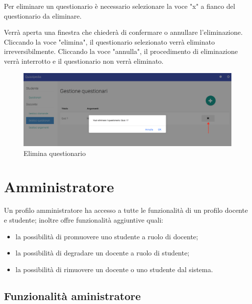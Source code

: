 \documentclass[12pt,a4paper]{article}
\begin{document}
		\par Per eliminare un questionario è necessario selezionare la voce "x" a fianco del questionario da eliminare. \\
		\par Verrà aperta una finestra che chiederà di confermare o annullare l'eliminazione. Cliccando la voce "elimina", il questionario selezionato verrà eliminato irreversibilmente. Cliccando la voce "annulla", il procedimento di eliminazione verrà interrotto e il questionario non verrà eliminato. \\
		
		\begin{figure}[H]	
			\centering
			\includegraphics[width=\linewidth]{../img/screenshot/eliminaQuestionario.png}
			\caption{Elimina questionario}
			\label{Elimina questionario}
		\end{figure}
		
		\section{Amministratore}
		\par Un profilo amministratore ha accesso a tutte le funzionalità di un profilo docente e studente; inoltre offre funzionalità aggiuntive quali: \\
		\begin{itemize}
			\item la possibilità di promuovere uno studente a ruolo di docente;
			\item la possibilità di degradare un docente a ruolo di studente;
			\item la possibilità di rimuovere un docente o uno studente dal sistema.
		\end{itemize}
		\subsection{Funzionalità aministratore}
		
\end{document}
